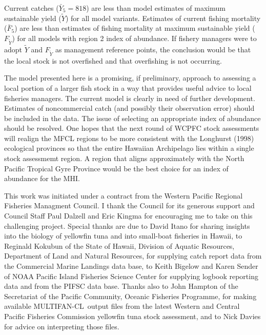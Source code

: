 \documentclass[12pt,letterpaper]{article}
\newcommand\singlespacing{\baselineskip=1.0\normalbaselineskip}
\newcommand\MFCL{MULTIFAN-CL}
\newcommand\MSY{\widetilde{Y}}
\newcommand\Fmsy{F_{\MSY}}
\begin{document}
Current catches ($\bar{Y}_5=818$) are less than model estimates of maximum
sustainable yield ($\MSY$) for all model variants. 
Estimates of current fishing mortality ($\bar{F}_5$) are less than
estimates of fishing mortality at maximum sustainable yield ($\Fmsy$)
for all models with region 2 index of abundance.
If fishery managers were to adopt $\MSY$ and $\Fmsy$ as management
reference points, the conclusion would be that the local stock is not
overfished and that overfishing is not occurring.

The model presented here is a promising, if preliminary,
approach to assessing a local
portion of a larger fish stock in a way that provides useful advice to
local fisheries managers. The current model is clearly in need of
further development. Estimates of noncommercial catch (and possibly
their observation error) should be included in the data. 
The issue of selecting an appropriate index of abundance should be
resolved. One hopes that the
next round of  WCPFC stock assessments will realign
the MFCL regions to be more consistent
with the Longhurst (1998) ecological provinces so that the entire
Hawaiian Archipelago lies within a single stock assessmemt region. 
A region that aligns approximately with  the North Pacific Tropical
Gyre Province would be the best choice for an index of abundance for
the MHI.



\clearpage
\singlespacing
{}
This work was initiated under a contract from the Western Pacific
Regional Fisheries Managment Council. 
I thank the Council for its generous support and
Council Staff Paul Dalzell and Eric Kingma for encouraging me to
take on this challenging project.
Special thanks are due 
to David Itano for sharing insights into the biology of yellowfin tuna
and into small-boat fisheries in Hawaii,
to Reginald Kokubun of the State of Hawaii, Division of Aquatic Resources,
Department of Land and Natural Resources, for supplying catch report
data from the Commercial Marine Landings data base,
to Keith Bigelow and Karen Sender of NOAA Pacific
Island Fisheries Science Center for supplying logbook reporting data and
from the PIFSC data base.
Thanks also to John Hampton of the Secretariat of the Pacific
Community, Oceanic Fisheries Programme, for making available \MFCL\
output files from the latest Western and Central Pacific
Fisheries Commission yellowfin tuna stock assessment, and to Nick
Davies for advice on interpreting those files.
\end{document}
